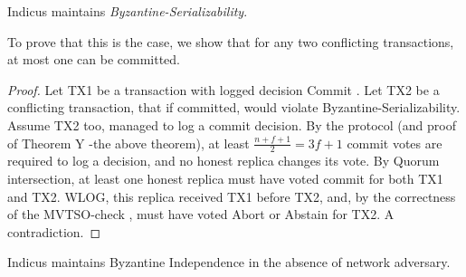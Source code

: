 \begin{theorem} 
Indicus maintains \textit{Byzantine-Serializability}.
\end{theorem}
To prove that this is the case, we show that for any two conflicting transactions, at most one can be committed.
\begin{proof}
Let TX1 be a transaction with logged decision Commit . Let TX2 be a conflicting transaction, that if committed, would violate Byzantine-Serializability. Assume TX2 too, managed to log a commit decision. By the protocol (and proof of Theorem Y -the above theorem), at least  $\frac{n+f+1}{2} = 3f+1$ commit votes are required to log a decision, and no honest replica changes its vote. By Quorum intersection, at least one honest replica must have voted commit for both TX1 and TX2. WLOG, this replica received TX1 before TX2, and, by the correctness of the MVTSO-check , must have voted Abort or Abstain for TX2. A contradiction.
\end{proof}




\begin{theorem} 
Indicus maintains Byzantine Independence in the absence of network adversary.
\end{theorem}

